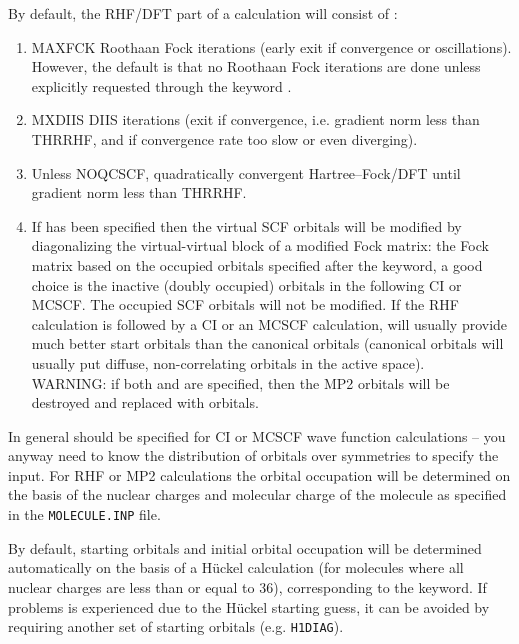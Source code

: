 
By default, the RHF/DFT part of a calculation will consist of :
\begin{enumerate}
\item {MAXFCK Roothaan Fock iterations (early exit if convergence
    or oscillations). However, the default is that no Roothaan Fock
iterations are done unless explicitly requested through the keyword
.
}
\item {MXDIIS DIIS iterations (exit if convergence, i.e. gradient norm
    less than THRRHF, and if convergence rate too slow or even diverging).
}
\item {Unless NOQCSCF, quadratically convergent Hartree--Fock/DFT until
    gradient norm less than THRRHF.
}
\item{If  has been specified
    then the virtual SCF orbitals will be modified by diagonalizing
    the virtual-virtual block of
    a modified Fock matrix: the Fock matrix
    based on the occupied orbitals specified after the keyword, a
    good choice is the inactive (doubly occupied) orbitals in the
    following CI or MCSCF.
    The occupied SCF orbitals will not be modified.
    If the RHF calculation is followed by a CI or an MCSCF calculation,
     will usually provide much
    better start orbitals than the canonical orbitals (canonical
    orbitals will usually put diffuse, non-correlating orbitals in the
    active space). \\
    WARNING: if both  and  are specified,
    then the MP2 orbitals will be destroyed and replaced with 
    orbitals.
}
\end{enumerate}

In general  should be specified for CI or MCSCF
wave function calculations -- you anyway need to know the distribution
of orbitals over symmetries to specify the  input.
For RHF
or MP2
calculations the orbital occupation will be determined on the
basis of the nuclear charges and molecular charge of the molecule as
specified in the \verb|MOLECULE.INP| file.

By default, starting orbitals and initial orbital occupation will
be determined automatically on the basis of a H\"{u}ckel
calculation (for molecules where all nuclear charges are
less than or equal to 36), corresponding to the  keyword.
If problems is experienced due to the
H\"{u}ckel starting guess, it can be avoided by requiring another set of
starting orbitals (e.g. \verb|H1DIAG|).

